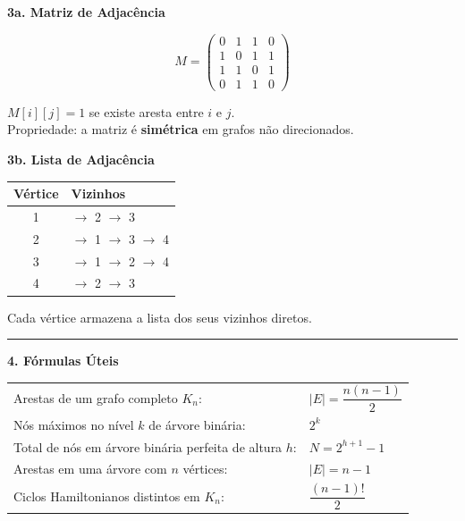 \documentclass[12pt,a4paper]{article}
\begin{document}
\begin{minipage}[t]{0.48\textwidth}
\textbf{3a. Matriz de Adjacência}

$$M = \begin{pmatrix}
 0 & 1 & 1 & 0 \\
 1 & 0 & 1 & 1 \\
 1 & 1 & 0 & 1 \\
 0 & 1 & 1 & 0
\end{pmatrix}$$

$M[i][j] = 1$ se existe aresta entre $i$ e $j$.\\
Propriedade: a matriz é \textbf{simétrica} em grafos não direcionados.
\end{minipage}
\hfill
\begin{minipage}[t]{0.48\textwidth}
\textbf{3b. Lista de Adjacência}

\renewcommand{\arraystretch}{1.4}
\begin{tabular}{c|l}
    \textbf{Vértice} & \textbf{Vizinhos} \\ \hline
    1 & $\to$ 2 $\to$ 3 \\
    2 & $\to$ 1 $\to$ 3 $\to$ 4 \\
    3 & $\to$ 1 $\to$ 2 $\to$ 4 \\
    4 & $\to$ 2 $\to$ 3 \\
\end{tabular}

\vspace{0.2cm}
Cada vértice armazena a lista dos seus vizinhos diretos.
\end{minipage}

\vspace{0.5cm}
\hrule
\vspace{0.4cm}

\noindent\textbf{4. Fórmulas Úteis}

\renewcommand{\arraystretch}{1.6}
\begin{tabular}{ll}
    Arestas de um grafo completo $K_n$: & $|E| = \dfrac{n(n-1)}{2}$ \\[0.2cm]
    Nós máximos no nível $k$ de árvore binária: & $2^k$ \\[0.2cm]
    Total de nós em árvore binária perfeita de altura $h$: & $N = 2^{h+1} - 1$ \\[0.2cm]
    Arestas em uma árvore com $n$ vértices: & $|E| = n - 1$ \\[0.2cm]
    Ciclos Hamiltonianos distintos em $K_n$: & $\dfrac{(n-1)!}{2}$ \\
\end{tabular}
\end{document}
